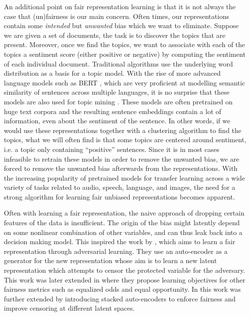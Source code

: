 \documentclass[nohyperref]{article}
\theoremstyle{plain}
\theoremstyle{definition}
\theoremstyle{remark}
\begin{document}
An additional point on fair representation learning is that it is not always the case that (un)fairness is our main concern. Often times, our representations contain some \emph{intended} but \emph{unwanted} bias which we want to eliminate. Suppose we are given a set of documents, the task is to discover the topics that are present. Moreover, once we find the topics, we want to associate with each of the topics a sentiment score (either positive or negative) by computing the sentiment of each individual document. Traditional algorithms use the underlying word distribution as a basis for a topic model. With the rise of more advanced language models such as BERT \cite{devlin-etal-2019-bert}, which are very proficient at modelling semantic similarity of sentences across multiple languages, it is no surprise that these models are also used for topic mining \cite{DBLP:journals/corr/abs-2103-00498}. These models are often pretrained on huge text corpora and the resulting sentence embeddings contain a lot of information, even about the sentiment of the sentence. In other words, if we would use these representations together with a clustering algorithm to find the topics, what we will often find is that some topics are centered around sentiment, i.e. a topic only containing ``positive'' sentences. Since it is in most cases infeasible to retrain these models in order to remove the unwanted bias, we are forced to remove the unwanted bias afterwards from the representations. With the increasing popularity of pretrained models for transfer learning across a wide variety of tasks related to audio, speech, language, and images, the need for a strong algorithm for learning fair unbiased representations becomes apparent.

Often with learning a fair representation, the naive approach of dropping certain features of the data is insufficient. The origin of the bias might latently depend on some nonlinear combination of other variables, and can thus leak back into a decision making model. This inspired the work by \cite{edwards2016censoring}, which aims to learn a fair representation through adversarial learning. They use an auto-encoder as a generator for the new representation whose aim is to learn a new latent representation which attempts to censor the protected variable for the adversary. This work was later extended in \cite{pmlr-v80-madras18a} where they propose learning objectives for other fairness metrics such as equalized odds and equal opportunity. In \cite{kenfack2021adversarial} this work was further extended by introducing stacked auto-encoders to enforce fairness and improve censoring at different latent spaces.
\end{document}
